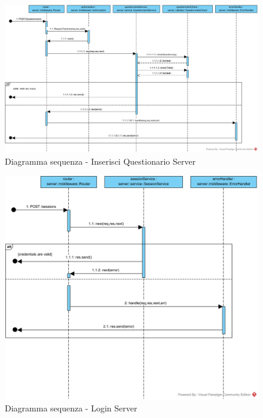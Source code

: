\documentclass[12pt,a4paper]{article}
\begin{document}
\begin{center}
	\begin{figure}[H]
		\centering \includegraphics[max width=\myheight, angle=90 ]{../img/diagrammiSequenza/inserisciQuestionarioServer.png}
		\caption{Diagramma sequenza - Inserisci Questionario Server}
	\end{figure}
\end{center}


\begin{center}
	\begin{figure}[H]
		\centering \includegraphics[max width=\myheight, angle=90 ]{../img/diagrammiSequenza/loginServer.png}
		\caption{Diagramma sequenza - Login Server}
	\end{figure}
\end{center}
\end{document}
